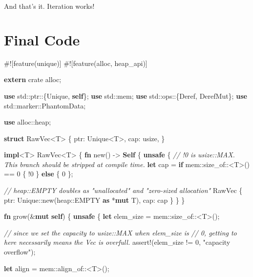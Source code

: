 \documentclass[a4paper,]{book}
\newenvironment{Shaded}{\begin{snugshade}}{\end{snugshade}}
\newcommand{\KeywordTok}[1]{\textcolor[rgb]{0.13,0.29,0.53}{\textbf{{#1}}}}
\newcommand{\DecValTok}[1]{\textcolor[rgb]{0.00,0.00,0.81}{{#1}}}
\newcommand{\StringTok}[1]{\textcolor[rgb]{0.31,0.60,0.02}{{#1}}}
\newcommand{\CommentTok}[1]{\textcolor[rgb]{0.56,0.35,0.01}{\textit{{#1}}}}
\newcommand{\OtherTok}[1]{\textcolor[rgb]{0.56,0.35,0.01}{{#1}}}
\newcommand{\NormalTok}[1]{{#1}}
\begin{document}
And that's it. Iteration works!

\section{Final Code}\label{sec--vec-final}

\begin{Shaded}
\begin{Highlighting}[]
\NormalTok{#![feature(unique)]}
\NormalTok{#![feature(alloc, heap_api)]}

\KeywordTok{extern} \NormalTok{crate alloc;}

\KeywordTok{use} \NormalTok{std::ptr::\{Unique, }\KeywordTok{self}\NormalTok{\};}
\KeywordTok{use} \NormalTok{std::mem;}
\KeywordTok{use} \NormalTok{std::ops::\{Deref, DerefMut\};}
\KeywordTok{use} \NormalTok{std::marker::PhantomData;}

\KeywordTok{use} \NormalTok{alloc::heap;}

\KeywordTok{struct} \NormalTok{RawVec<T> \{}
    \NormalTok{ptr: Unique<T>,}
    \NormalTok{cap: usize,}
\NormalTok{\}}

\KeywordTok{impl}\NormalTok{<T> RawVec<T> \{}
    \KeywordTok{fn} \NormalTok{new() -> }\KeywordTok{Self} \NormalTok{\{}
        \KeywordTok{unsafe} \NormalTok{\{}
            \CommentTok{// !0 is usize::MAX. This branch should be stripped at compile time.}
            \KeywordTok{let} \NormalTok{cap = }\KeywordTok{if} \NormalTok{mem::size_of::<T>() == }\DecValTok{0} \NormalTok{\{ !}\DecValTok{0} \NormalTok{\} }\KeywordTok{else} \NormalTok{\{ }\DecValTok{0} \NormalTok{\};}

            \CommentTok{// heap::EMPTY doubles as "unallocated" and "zero-sized allocation"}
            \NormalTok{RawVec \{ ptr: Unique::new(heap::EMPTY }\KeywordTok{as} \NormalTok{*}\KeywordTok{mut} \NormalTok{T), cap: cap \}}
        \NormalTok{\}}
    \NormalTok{\}}

    \KeywordTok{fn} \NormalTok{grow(&}\KeywordTok{mut} \KeywordTok{self}\NormalTok{) \{}
        \KeywordTok{unsafe} \NormalTok{\{}
            \KeywordTok{let} \NormalTok{elem_size = mem::size_of::<T>();}

            \CommentTok{// since we set the capacity to usize::MAX when elem_size is}
            \CommentTok{// 0, getting to here necessarily means the Vec is overfull.}
            \OtherTok{assert!}\NormalTok{(elem_size != }\DecValTok{0}\NormalTok{, }\StringTok{"capacity overflow"}\NormalTok{);}

            \KeywordTok{let} \NormalTok{align = mem::align_of::<T>();}


\end{Highlighting}
\end{Shaded}
\end{document}

